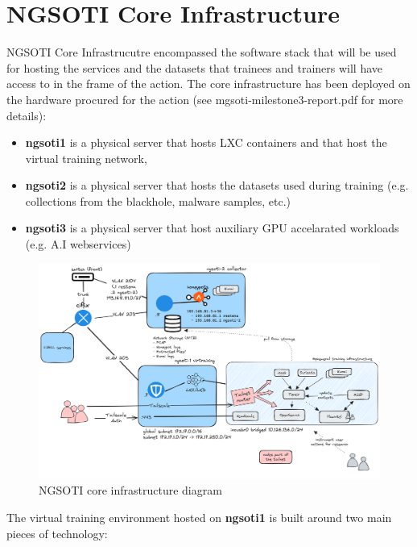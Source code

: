 \section{NGSOTI Core Infrastructure}

NGSOTI Core Infrastrucutre encompassed the software stack that will be used for hosting the services and the datasets that trainees and trainers will have access to in the frame of the action. The core infrastructure has been deployed on the hardware procured for the action (see mgsoti-milestone3-report.pdf for more details):

\begin{itemize}
	\item {\bf{ngsoti1}} is a physical server that hosts LXC containers and that host the virtual training network,
	\item {\bf{ngsoti2}} is a physical server that hosts the datasets used during training (e.g. collections from the blackhole, malware samples, etc.)
	\item {\bf{ngsoti3}} is a physical server that host auxiliary GPU accelarated workloads (e.g. A.I webservices)
\end{itemize}



\begin{figure}[ht]
	\centering
	\includegraphics[width=\textwidth]{./img/NGSOTI-architecture.png}
	\caption{NGSOTI core infrastructure diagram}
	\label{fig1}
	\end{figure}

The virtual training environment hosted on {\bf{ngsoti1}} is built around two main pieces of technology:

